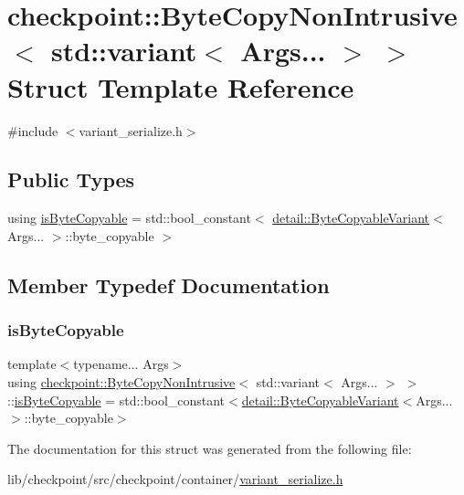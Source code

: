 \hypertarget{structcheckpoint_1_1_byte_copy_non_intrusive_3_01std_1_1variant_3_01_args_8_8_8_01_4_01_4}{}\section{checkpoint\+:\+:Byte\+Copy\+Non\+Intrusive$<$ std\+:\+:variant$<$ Args... $>$ $>$ Struct Template Reference}
\label{structcheckpoint_1_1_byte_copy_non_intrusive_3_01std_1_1variant_3_01_args_8_8_8_01_4_01_4}


{\ttfamily \#include $<$variant\+\_\+serialize.\+h$>$}

\subsection*{Public Types}
\begin{DoxyCompactItemize}
\item 
using \hyperlink{structcheckpoint_1_1_byte_copy_non_intrusive_3_01std_1_1variant_3_01_args_8_8_8_01_4_01_4_aaa31399bbfe05a8437a8ef5b17ea2243}{is\+Byte\+Copyable} = std\+::bool\+\_\+constant$<$ \hyperlink{structcheckpoint_1_1detail_1_1_byte_copyable_variant}{detail\+::\+Byte\+Copyable\+Variant}$<$ Args... $>$\+::byte\+\_\+copyable $>$
\end{DoxyCompactItemize}


\subsection{Member Typedef Documentation}
\mbox{\label{structcheckpoint_1_1_byte_copy_non_intrusive_3_01std_1_1variant_3_01_args_8_8_8_01_4_01_4_aaa31399bbfe05a8437a8ef5b17ea2243}} 
\subsubsection{\texorpdfstring{is\+Byte\+Copyable}{isByteCopyable}}
{\footnotesize\ttfamily template$<$typename... Args$>$ \\
using \hyperlink{structcheckpoint_1_1_byte_copy_non_intrusive}{checkpoint\+::\+Byte\+Copy\+Non\+Intrusive}$<$ std\+::variant$<$ Args... $>$ $>$\+::\hyperlink{structcheckpoint_1_1_byte_copy_non_intrusive_3_01std_1_1variant_3_01_args_8_8_8_01_4_01_4_aaa31399bbfe05a8437a8ef5b17ea2243}{is\+Byte\+Copyable} =  std\+::bool\+\_\+constant$<$\hyperlink{structcheckpoint_1_1detail_1_1_byte_copyable_variant}{detail\+::\+Byte\+Copyable\+Variant}$<$Args...$>$\+::byte\+\_\+copyable$>$}



The documentation for this struct was generated from the following file\+:\begin{DoxyCompactItemize}
\item 
lib/checkpoint/src/checkpoint/container/\hyperlink{variant__serialize_8h}{variant\+\_\+serialize.\+h}\end{DoxyCompactItemize}
